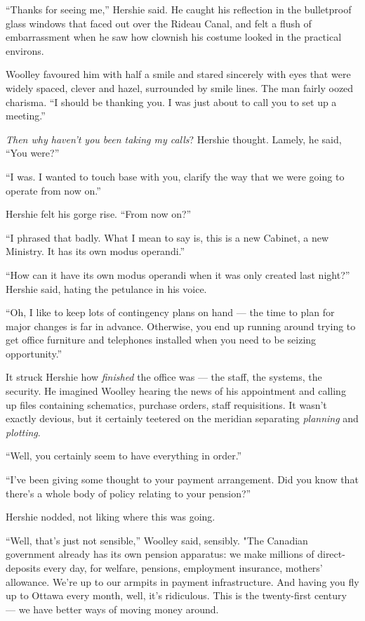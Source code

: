 ``Thanks for seeing me,'' Hershie said. He caught his reflection in
the bulletproof glass windows that faced out over the Rideau Canal,
and felt a flush of embarrassment when he saw how clownish his
costume looked in the practical environs.

Woolley favoured him with half a smile and stared sincerely with
eyes that were widely spaced, clever and hazel, surrounded by smile
lines. The man fairly oozed charisma.
``I should be thanking you. I was just about to call you to set up a meeting.''

\emph{Then why haven't you been taking my calls}? Hershie thought.
Lamely, he said, ``You were?''

``I was. I wanted to touch base with you, clarify the way that we were going to 
operate from now on.''

Hershie felt his gorge rise. ``From now on?''

``I phrased that badly. What I mean to say is, this is a new Cabinet, a new 
Ministry. It has its own modus operandi.''

``How can it have its own modus operandi when it was only created last night?''
Hershie said, hating the petulance in his voice.

``Oh, I like to keep lots of contingency plans on hand --- the time to plan for 
major changes is far in advance. Otherwise, you end up running around trying to 
get office furniture and telephones installed when you need to be seizing 
opportunity.''

It struck Hershie how \emph{finished} the office was --- the staff,
the systems, the security. He imagined Woolley hearing the news of
his appointment and calling up files containing schematics,
purchase orders, staff requisitions. It wasn't exactly devious, but
it certainly teetered on the meridian separating \emph{planning}
and \emph{plotting}.

``Well, you certainly seem to have everything in order.''

``I've been giving some thought to your payment arrangement. Did you know that 
there's a whole body of policy relating to your pension?''

Hershie nodded, not liking where this was going.

``Well, that's just not sensible,'' Woolley said, sensibly. "The
Canadian government already has its own pension apparatus: we make
millions of direct-deposits every day, for welfare, pensions,
employment insurance, mothers' allowance. We're up to our armpits
in payment infrastructure. And having you fly up to Ottawa every
month, well, it's ridiculous. This is the twenty-first century ---
we have better ways of moving money around.

